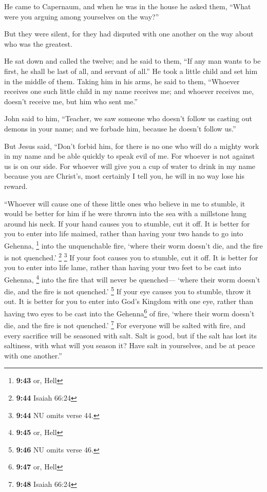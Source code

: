  He came to Capernaum, and when he was in the house he
asked them, ``What were you arguing among yourselves on the way?''

 But they were silent, for they had disputed with one
another on the way about who was the greatest.

 He sat down and called the twelve; and he said to them,
``If any man wants to be first, he shall be last of all, and servant of
all.''  He took a little child and set him in the middle
of them. Taking him in his arms, he said to them, 
``Whoever receives one such little child in my name receives me; and
whoever receives me, doesn't receive me, but him who sent me.''

 John said to him, ``Teacher, we saw someone who doesn't
follow us casting out demons in your name; and we forbade him, because
he doesn't follow us.''

 But Jesus said, ``Don't forbid him, for there is no one
who will do a mighty work in my name and be able quickly to speak evil
of me.  For whoever is not against us is on our side.
 For whoever will give you a cup of water to drink in my
name because you are Christ's, most certainly I tell you, he will in no
way lose his reward.

 ``Whoever will cause one of these little ones who
believe in me to stumble, it would be better for him if he were thrown
into the sea with a millstone hung around his neck.  If
your hand causes you to stumble, cut it off. It is better for you to
enter into life maimed, rather than having your two hands to go into
Gehenna, \footnote{\textbf{9:43} or, Hell} into the unquenchable fire,
 `where their worm doesn't die, and the fire is not
quenched.' \footnote{\textbf{9:44} Isaiah 66:24} \footnote{\textbf{9:44}
  NU omits verse 44.}  If your foot causes you to
stumble, cut it off. It is better for you to enter into life lame,
rather than having your two feet to be cast into Gehenna, \footnote{\textbf{9:45}
  or, Hell} into the fire that will never be quenched--- 
`where their worm doesn't die, and the fire is not quenched.'
\footnote{\textbf{9:46} NU omits verse 46.}  If your eye
causes you to stumble, throw it out. It is better for you to enter into
God's Kingdom with one eye, rather than having two eyes to be cast into
the Gehenna\footnote{\textbf{9:47} or, Hell} of fire, 
`where their worm doesn't die, and the fire is not quenched.'
\footnote{\textbf{9:48} Isaiah 66:24}  For everyone will
be salted with fire, and every sacrifice will be seasoned with salt.
 Salt is good, but if the salt has lost its saltiness,
with what will you season it? Have salt in yourselves, and be at peace
with one another.''

